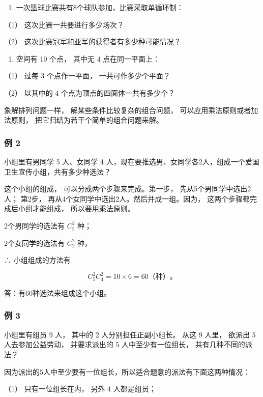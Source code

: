 \begin{enumerate}[start=4]
\item
  一次篮球比赛共有8个球队参加，比赛采取单循环制：
\end{enumerate}

（1） 这次比赛一共要进行多少场次？

（2） 这次比赛冠军和亚军的获得者有多少种可能情况？

\begin{enumerate}[start=5]
\item
  空间有 10 个点， 其中无 4 点在同一平面上：
\end{enumerate}

（1） 过每 3 个点作一平面， 一共可作多少个平面？

（2） 以其中的 4 个点为顶点的四面体一共有多少个？

象解排列问题一样， 解某些条件比较复杂的组合问题，
可以应用乘法原则或者加法原则， 把它归结为若干个简单的组合问题来解。

\subsubsection{例 2}

小组里有男同学 5 人、女同学 4
人，现在要推选男、女同学各2人，组成一个爱国卫生宣传小组，共有多少种选法？

 这个小组的组成， 可以分成两个步骤来完成。第一步，
先从5个男同学中选出2人； 第2步，
再从4个女同学中选出2人。然后并成一组。因为，
这两个步骤都完成后小组才能组成， 所以要用乘法原则。

 2个男同学的选法有 \(C_5^2\) 种；

2个女同学的选法有 \(C_2^2\) 种，

∴ 小组组成的方法有

\[
C_5^2C_4^2=10\times6=60\text{（种）}\text{。}
\]

答：有60种选法来组成这个小组。

\subsubsection{例 3}

小组里有组员 9 人， 其中的 2 人分别担任正副小组长。 从这 9 人里， 欲派出
5 人去参加公益劳动， 并要求派出的 5 人中至少有一位组长，
共有几种不同的派法？

因为派出的5人中至少要有一位组长，所以适合题意的派法有下面这两种情况：

（1） 只有一位组长在内， 另外 4 人都是组员；

